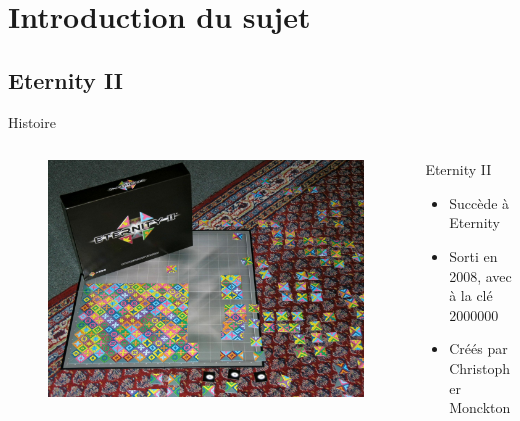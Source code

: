 \section{Introduction du sujet}
	\subsection{Eternity II}
	
	\begin{frame}{Histoire}
		\begin{columns}
			\begin{column}{0.49\linewidth}
				\begin{figure}[H]
					\includegraphics[width=\linewidth]{images/eternity_2}
				\end{figure}
			\end{column}
			\begin{column}{0.49\linewidth}
				\begin{Vblock}{Eternity II}
					\begin{itemize}[<+->]
						\item Succède à Eternity
						\item Sorti en 2008, avec à la clé \textdollar$2000000$
						\item Créés par Christopher Monckton
					\end{itemize}
				\end{Vblock}
			\end{column}
		\end{columns}
	\end{frame}

